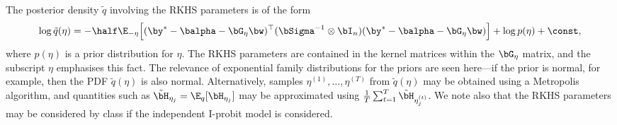 
The posterior density $\tilde q$ involving the RKHS parameters is of the form
\[
  \log\tilde q(\eta) =  -\half\E_{-\eta} \Big[ (\by^* - \balpha - \bG_\eta\bw)^\top (\bSigma^{-1} \otimes \bI_n) (\by^* - \balpha - \bG_\eta\bw) \Big] + \log p(\eta) + \const,
\]
where $p(\eta)$ is a prior distribution for $\eta$.
The RKHS parameters are contained in the kernel matrices within the $\bG_\eta$ matrix, and the subscript $\eta$ emphasises this fact.
The relevance of exponential family distributions for the priors are seen here---if the prior is normal, for example, then the PDF $\tilde q(\eta)$ is also normal.
Alternatively, samples $\eta^{(1)},\dots,\eta^{(T)}$ from $\tilde q(\eta)$ may be obtained using a Metropolis algorithm, and quantities such as $\tilde\bH_{\eta_j} = \E_q[\bH_{\eta_j}]$ may be approximated using $\frac{1}{T}\sum_{t=1}^T \tilde\bH_{\eta_j^{(t)}}$.
We note also that the RKHS parameters may be considered by class if the independent I-probit model is considered.

